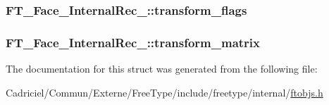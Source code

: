 \hypertarget{struct_f_t___face___internal_rec___a2495aced35040e1b7c2bc0afcd7a920d}{
\subsubsection[{transform\-\_\-flags}]{ F\-T\-\_\-\-Face\-\_\-\-Internal\-Rec\-\_\-\-::transform\-\_\-flags}}\label{struct_f_t___face___internal_rec___a2495aced35040e1b7c2bc0afcd7a920d}
\hypertarget{struct_f_t___face___internal_rec___ab4be2dcda098e6136f5701580d18032d}{
\subsubsection[{transform\-\_\-matrix}]{ F\-T\-\_\-\-Face\-\_\-\-Internal\-Rec\-\_\-\-::transform\-\_\-matrix}}\label{struct_f_t___face___internal_rec___ab4be2dcda098e6136f5701580d18032d}


The documentation for this struct was generated from the following file\-:\begin{DoxyCompactItemize}
\item 
Cadriciel/\-Commun/\-Externe/\-Free\-Type/include/freetype/internal/\hyperlink{ftobjs_8h}{ftobjs.\-h}\end{DoxyCompactItemize}
